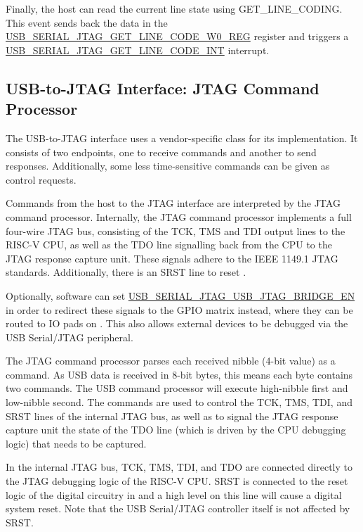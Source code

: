 \documentclass[main\_\_EN.tex]{subfiles}
\begin{document}
Finally, the host can read the current line state using GET\_LINE\_CODING. This event sends back the data in the \hyperref[regdesc:USBSERIALJTAGGETLINECODEW0REG]{USB\_SERIAL\_JTAG\_GET\_LINE\_CODE\_W0\_REG} register and triggers a \hyperref[int:USBSERIALJTAGGETLINECODEINT]{USB\_SERIAL\_JTAG\_GET\_LINE\_CODE\_INT} interrupt.


\subsection{USB-to-JTAG Interface: JTAG Command Processor}    

The USB-to-JTAG interface uses a vendor-specific class for its implementation. It consists of two endpoints, one to receive commands and another to send responses. Additionally, some less time-sensitive commands can be given as control requests.

Commands from the host to the JTAG interface are interpreted by the JTAG command processor. Internally, the JTAG command processor implements a full four-wire JTAG bus, consisting of the TCK, TMS and TDI output lines to the RISC-V CPU, as well as the TDO line signalling back from the CPU to the JTAG response capture unit. These signals adhere to the IEEE 1149.1 JTAG standards. Additionally, there is an SRST line to reset \chipname{}.

Optionally, software can set \hyperref[fielddesc:USBSERIALJTAGUSBJTAGBRIDGEEN]{USB\_SERIAL\_JTAG\_USB\_JTAG\_BRIDGE\_EN} in order to redirect these signals to the GPIO matrix instead, where they can be routed to IO pads on \chipname{}. This also allows external devices to be debugged via the USB Serial/JTAG peripheral.

The JTAG command processor parses each received nibble (4-bit value) as a command. As USB data is received in 8-bit bytes, this means each byte contains two commands. The USB command processor will execute high-nibble first and low-nibble second. The commands are used to control the TCK, TMS, TDI, and SRST lines of the internal JTAG bus, as well as to signal the JTAG response capture unit the state of the TDO line (which is driven by the CPU debugging logic) that needs to be captured.

In the internal JTAG bus, TCK, TMS, TDI, and TDO are connected directly to the JTAG debugging logic of the RISC-V CPU. SRST is connected to the reset logic of the digital circuitry in \chipname{} and a high level on this line will cause a digital system reset. Note that the USB Serial/JTAG controller itself is not affected by SRST.
\end{document}
